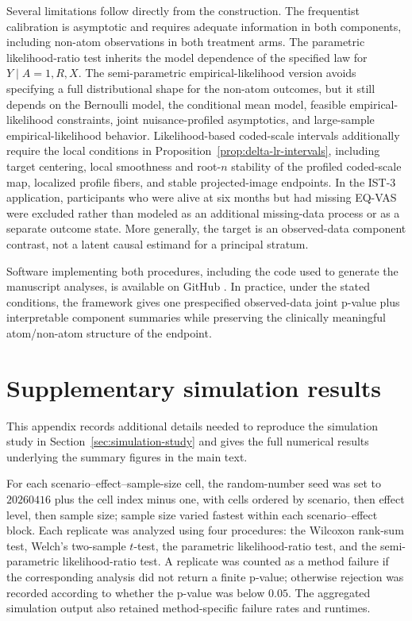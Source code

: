 \documentclass[11pt]{article}
\begin{document}
Several limitations follow directly from the construction. The frequentist calibration is asymptotic and requires adequate information in both components, including non-atom observations in both treatment arms. The parametric likelihood-ratio test inherits the model dependence of the specified law for $Y\mid A=1,R,X$. The semi-parametric empirical-likelihood version avoids specifying a full distributional shape for the non-atom outcomes, but it still depends on the Bernoulli model, the conditional mean model, feasible empirical-likelihood constraints, joint nuisance-profiled asymptotics, and large-sample empirical-likelihood behavior. Likelihood-based coded-scale intervals additionally require the local conditions in Proposition~\ref{prop:delta-lr-intervals}, including target centering, local smoothness and root-$n$ stability of the profiled coded-scale map, localized profile fibers, and stable projected-image endpoints. In the IST-3 application, participants who were alive at six months but had missing EQ-VAS were excluded rather than modeled as an additional missing-data process or as a separate outcome state. More generally, the target is an observed-data component contrast, not a latent causal estimand for a principal stratum.

Software implementing both procedures, including the code used to generate the manuscript analyses, is available on GitHub \citep{TruncCompGitHub}. In practice, under the stated conditions, the framework gives one prespecified observed-data joint p-value plus interpretable component summaries while preserving the clinically meaningful atom/non-atom structure of the endpoint.

\clearpage
\appendix
\section{Supplementary simulation results}\label{app:supplementary-simulation-results}

This appendix records additional details needed to reproduce the simulation study in Section~\ref{sec:simulation-study} and gives the full numerical results underlying the summary figures in the main text.

For each scenario--effect--sample-size cell, the random-number seed was set to $20260416$ plus the cell index minus one, with cells ordered by scenario, then effect level, then sample size; sample size varied fastest within each scenario--effect block. Each replicate was analyzed using four procedures: the Wilcoxon rank-sum test, Welch's two-sample $t$-test, the parametric likelihood-ratio test, and the semi-parametric likelihood-ratio test. A replicate was counted as a method failure if the corresponding analysis did not return a finite p-value; otherwise rejection was recorded according to whether the p-value was below $0.05$. The aggregated simulation output also retained method-specific failure rates and runtimes.
\end{document}
